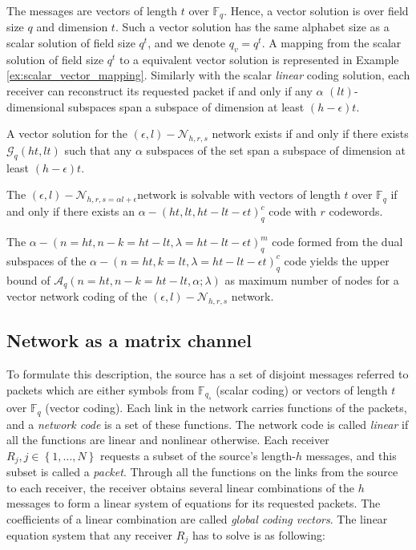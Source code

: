 The messages are vectors of length $t$ over $\ensuremath{\mathbb{F}}_{q}$.
Hence, a vector solution is over field size $q$ and dimension $t$.
Such a vector solution has the same alphabet size as a scalar solution
of field size $q^{t}$, and we denote $q_{v}=q^{t}$. A mapping from
the scalar solution of field size $q^{t}$ to a equivalent vector
solution is represented in Example \ref{ex:scalar_vector_mapping}.
Similarly with the scalar \textit{linear} coding solution, each receiver
can reconstruct its requested packet if and only if any $\alpha$
$\left(lt\right)$-dimensional subspaces span a subspace of dimension
at least $\left(h-\epsilon\right)t$.
\begin{thm}
A vector solution for the $(\epsilon,l)-\mathcal{N}_{h,r,s}$ network
exists if and only if there exists $\mathcal{G}_{q}\left(ht,lt\right)$
such that any $\alpha$ subspaces of the set span a subspace of dimension
at least $\left(h-\epsilon\right)t$. \cite{Zhang:2019}
\end{thm}
%
\begin{thm}
The $(\epsilon,l)-\mathcal{N}_{h,r,s=\alpha l+\epsilon}$network is
solvable with vectors of length $t$ over $\ensuremath{\mathbb{F}}_{q}$
if and only if there exists an $\alpha-\left(ht,lt,ht-lt-\epsilon t\right)_{q}^{c}$
code with $r$ codewords. \cite{Zhang:2019}
\end{thm}
\begin{cor}
The $\alpha-\left(n=ht,n-k=ht-lt,\lambda=ht-lt-\epsilon t\right)_{q}^{m}$
code formed from the dual subspaces of the $\alpha-\left(n=ht,k=lt,\lambda=ht-lt-\epsilon t\right)_{q}^{c}$
code yields the upper bound of $\mathcal{A}_{q}\left(n=ht,n-k=ht-lt,\alpha;\lambda\right)$
as maximum number of nodes for a vector network coding of the $(\epsilon,l)-\mathcal{N}_{h,r,s}$
network. \label{cor:dual_subspaces}
\end{cor}

\subsection{Network as a matrix channel}

To formulate this description, the source has a set of disjoint messages
referred to packets which are either symbols from $\ensuremath{\mathbb{F}}_{q_{s}}$
(scalar coding) or vectors of length $t$ over $\ensuremath{\mathbb{F}}_{q}$
(vector coding). Each link in the network carries functions of the
packets, and a \textit{network code} is a set of these functions.
The network code is called \textit{linear} if all the functions are
linear and nonlinear otherwise. Each receiver $R_{j},j\in\left\{ 1,\ldots,N\right\} $
requests a subset of the source's length-$h$ messages, and this subset
is called a \textit{packet}. Through all the functions on the links
from the source to each receiver, the receiver obtains several linear
combinations of the $h$ messages to form a linear system of equations
for its requested packets. The coefficients of a linear combination
are called \textit{global coding vectors}. The linear equation system
that any receiver $R_{j}$ has to solve is as following:

